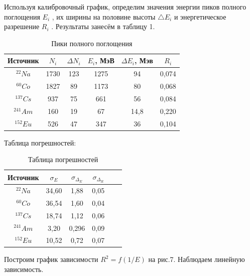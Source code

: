 \documentclass[14pt,a4paper]{scrartcl}
\begin{document}
Используя калибровочный график, определим значения энергии пиков полного поглощения $E_i$ , их ширины на половине высоты $\triangle E_i$ и энергетическое разрешение $R_i$ . Результаты занесём в таблицу 1. 




\begin{table}[h]
    \centering
    \begin{tabular}{|c|c|c|c|c|c|}
    \hline
        Источник & $N_i$ & $\Delta N_i$ & $E_i$, МэВ & $\Delta E_i$, Мэв & $R_i$\\ \hline
        $^{22} Na$ & 1730 & 123 & 1275 & 94 &  0,074 \\ \hline
        $^{60} Co$  & 1827 & 89 & 1173 & 80 & 0,068\\ \hline
        $^{137} Cs$  & 937 & 75 & 661 & 56 & 0,084\\ \hline
        $^{241} Am$ & 160 & 19 & 67 & 14,8 & 0,220\\ \hline
        $^{152} Eu$  & 526 & 47 & 347 & 36 & 0,104\\ \hline
    \end{tabular}
    \caption{Пики полного поглощения}
\end{table}




Таблица погрешностей:


\begin{table}[h]
    \centering
    \begin{tabular}{|c|c|c|c|c|c|}
    \hline
        Источник & $\sigma_E$ & $\sigma_{\Delta_E}$ & $\sigma_{\Delta_R}$ \\ \hline
        $^{22} Na$ & 34,60 & 1,88 & 0,05  \\ \hline
        $^{60} Co$  & 36,54 & 1,60 & 0,04\\ \hline
        $^{137} Cs$  & 18,74 & 1,12 & 0,06\\ \hline
        $^{241} Am$ & 3,20 & 0,296 & 0,09 \\ \hline
        $^{152} Eu$  & 10,52 & 0,72 & 0,07 \\ \hline
    \end{tabular}
    \caption{Таблица погрешностей}
\end{table}



Построим график зависимости $R^2 = f(1/E)$ на рис.7. Наблюдаем линейную зависимость.
\end{document}
